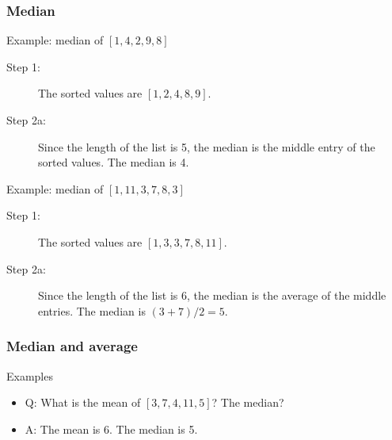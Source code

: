 \documentclass[handout]{beamer}
\begin{document}

   \begin{frame} \frametitle{Median}

   \begin{block}
   {Example: median of $[1,4,2,9,8]$}

   \begin{description}
   \item[Step 1:] The sorted values are $[1,2,4,8,9]$.

   \item[Step 2a:] Since the length of the list is 5, the median is the
   middle entry of the sorted values. The median is 4.

   \end{description}
   \end{block}

   \begin{block}
   {Example: median of $[1,11,3,7,8,3]$}

   \begin{description}
   \item[Step 1:] The sorted values are $[1,3,3,7,8,11]$.

   \item[Step 2a:] Since the length of the list is 6, the median is the
   average of the middle entries. The median is $(3+7)/2=5$.

   \end{description}
   \end{block}
   \end{frame}


   \begin{frame} \frametitle{Median and average}

   \begin{block}
   {Examples}

   \begin{itemize}
   \item Q: What is the mean of $[3,7,4,11,5]$? The median?

   \item A: The mean is 6. The median is 5.


   \end{itemize}
   \end{block}
   \end{frame}

\end{document}
